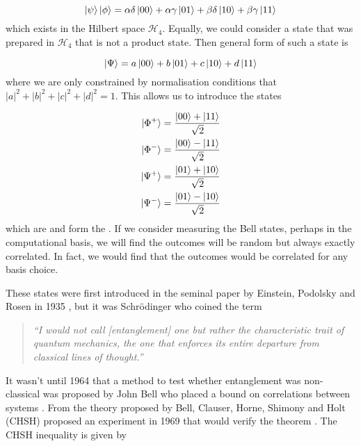 \begin{equation}
	\ket{\psi}\ket{\phi} = \alpha\delta\ket{00} + \alpha\gamma\ket{01} + \beta\delta\ket{10} + \beta\gamma\ket{11}
\end{equation}
which exists in the Hilbert space $\mathcal{H}_4$. Equally, we could consider a state that was prepared in $\mathcal{H}_4$ that is not a product state. Then general form of such a state is

\begin{equation}
	\ket{\Psi} = a\ket{00} + b\ket{01} + c\ket{10} + d\ket{11}
\end{equation}
where we are only constrained by normalisation conditions that $|a|^2 + |b|^2 + |c|^2 + |d|^2 = 1$. This allows us to introduce the states

\begin{align}
	\label{eq:BellStateStart}
	\ket{\Phi^+} &= \frac{\ket{00} + \ket{11}}{\sqrt{2}}\\
	\ket{\Phi^-} &= \frac{\ket{00} - \ket{11}}{\sqrt{2}}\\
	\ket{\Psi^+} &= \frac{\ket{01} + \ket{10}}{\sqrt{2}}\\
	\ket{\Psi^-} &= \frac{\ket{01} - \ket{10}}{\sqrt{2}}
	\label{eq:BellStateEnd}
\end{align}
which are  and form the . If we consider measuring the Bell states, perhaps in the computational basis, we will find the outcomes will be random but always exactly correlated. In fact, we would find that the outcomes would be correlated for any basis choice.

These states were first introduced in the seminal paper by Einstein, Podolsky and Rosen in 1935 \cite{einstein1935can}, but it was Schr\"{o}dinger who coined the term

\begin{quote}
\textit{``I would not call [entanglement] one but rather the characteristic trait of quantum mechanics, the one that enforces its entire departure from classical lines of thought.''}
\end{quote}

It wasn't until 1964 that a method to test whether entanglement was non-classical was proposed by John Bell who placed a bound on correlations between systems \cite{Bell1964Einstein}. From the theory proposed by Bell, Clauser, Horne, Shimony and Holt (CHSH) proposed an experiment in 1969 that would verify the theorem \cite{CHSH}. The CHSH inequality is given by 

